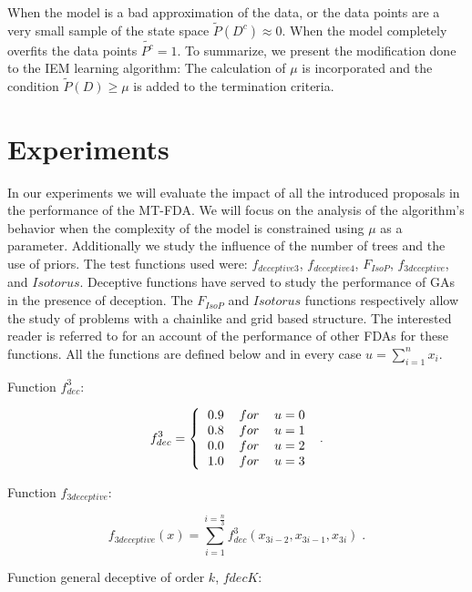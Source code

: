 \documentclass[runningheads]{llncs}
\begin{document}
  When the model is a bad
 approximation of the data, or the data points are a very small sample of the state
 space $\tilde{P}(D^c) \approx 0$. When the model completely overfits the data points
 $\tilde{P^c}=1$.  To summarize, we present the modification done to the IEM learning algorithm: The
 calculation of $\mu$ is incorporated and the condition $\tilde{P}(D) \geq \mu$ is
 added to the termination criteria.

\section{Experiments} \label{EXPERIMENTS}

In our experiments  we will evaluate the impact of all the introduced proposals  in the performance of the MT-FDA. We will focus on the analysis of the
algorithm's behavior when the complexity of the model is constrained  using
$\mu$ as a parameter. Additionally we study the influence of
the number of trees and the use of priors. The test functions used were:
$f_{deceptive3}$, $f_{deceptive4}$, $F_{IsoP}$, $f_{3deceptive}$, and
$Isotorus$. Deceptive functions have served to study the performance of GAs in
the presence of deception. The $F_{IsoP}$ and $Isotorus$ functions
respectively allow the
study of problems with a chainlike and grid based structure. The interested
reader is referred to  \cite{Larranhaga_et_Lozano:2001} for an account of the performance of other FDAs for these
functions. All the functions are defined below and in every case
$u=\sum_{i=1}^{n} x_i$.


Function $f_{dec}^3$: 
 
\begin{equation} 
f_{dec}^3=\left\{  
\begin{tabular}{ccc} 
$0.9$ & $for$ & $u=0$ \\  
$0.8$ & $for$ & $u=1$ \\  
$0.0$ & $for$ & $u=2$ \\  
$1.0$ & $for$ & $u=3$ 
\end{tabular} 
\right. \;.  \label{GOLDBERGDEC3} 
\end{equation} 
 
Function $f_{3deceptive}$: 

\begin{equation}  
 f_{3deceptive}(x)=\sum\limits_{i=1}^{i=\frac n3}f_{dec}^3(x_{3i-2},x_{3i-1},x_{3i}) \;. 
 \label{DEC3}
\end{equation} 

Function general deceptive of order $k$, $fdecK$: 
 
\end{document}
